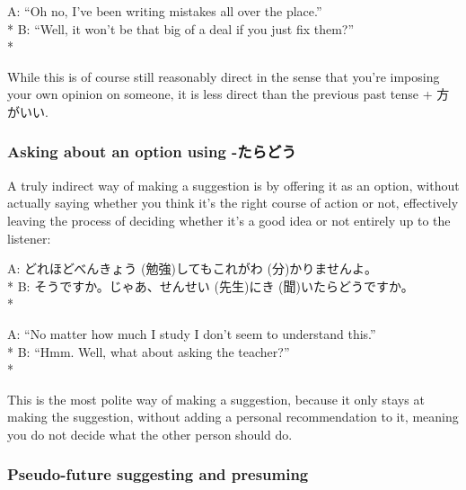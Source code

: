 \documentclass[11pt, b5paper, twoside, openright, onecolumn]{book}
\makeatletter
\newcommand*{\rubystack}[2]{{\relscale{0.5}%
  \begin{tabular}[b]{@{}c@{}}%
    {#1}\\%
   {\textscale{2}{#2}}%
  \end{tabular}}%
}
\DeclareRobustCommand*{\ruby}[2]{%
  \mbox{%
    \setlength{\parskip}{0ex}%
    \BeginAccSupp{method=pdfstringdef,ActualText={#1}}%
      \rubystack{\phantom{#2}}{#1}%
      \llap{%
        \rubystack{#2}{\phantom{#1}}%
      }%
    \EndAccSupp{}%
  }%
}
\renewcommand*{\ruby}[2]{#2 (#1)}%
\newenvironment{exampleblock}{
\setlength{\parindent}{0.6in}
\begin{minipage}[t]{\dimexpr\textwidth-\parindent}}
{\end{minipage}}
\makeatother
\begin{document}
\begin{exampleblock}
A: “Oh no‚ I’ve been writing mistakes all over the place.” \\* 
B: “Well‚ it won’t be that big of a deal if you just fix them?” \\* 
\end{exampleblock}
\vspace{0.2cm}

While this is of course still reasonably direct in the sense that you’re imposing your own opinion on someone‚ it is less direct than the previous past tense + 方がいい.

\subsubsection{Asking about an option using -たらどう}

A truly indirect way of making a suggestion is by offering it as an option‚ without actually saying whether you think it’s the right course of action or not‚ effectively leaving the process of deciding whether it’s a good idea or not entirely up to the listener:

\vspace{0.4cm}
\begin{exampleblock}
A: どれほど\ruby{勉強}{べんきょう}してもこれが\ruby{分}{わ}かりませんよ。 \\* 
B: そうですか。じゃあ、\ruby{先生}{せんせい}に\ruby{聞}{き}いたらどうですか。 \\* 
\end{exampleblock}
\vspace{0.2cm}

\begin{exampleblock}
A: “No matter how much I study I don’t seem to understand this.” \\* 
B: “Hmm. Well‚ what about asking the teacher?” \\* 
\end{exampleblock}
\vspace{0.2cm}

This is the most polite way of making a suggestion‚ because it only stays at making the suggestion‚ without adding a personal recommendation to it‚ meaning you do not decide what the other person should do.

\subsubsection{Pseudo-future suggesting and presuming}
\end{document}
